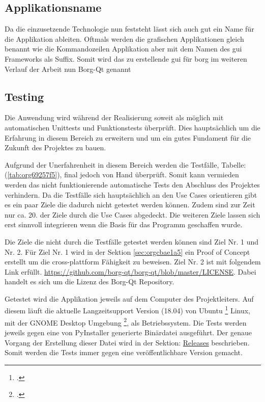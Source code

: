 \subsection{Applikationsname}
\label{sec:org525ca03}

Da die einzusetzende Technologie nun feststeht lässt sich auch gut ein Name für
die Applikation ableiten. Oftmals werden die grafischen Applikationen gleich
benannt wie die Kommandozeilen Applikation aber mit dem Namen des \gls{gui}
Frameworks als Suffix. Somit wird das zu erstellende \gls{gui} für \gls{borg} im
weiteren Verlauf der Arbeit nun Borg-Qt genannt

\subsection{Testing}
\label{sec:org8458d46}

Die Anwendung wird während der Realisierung soweit als möglich mit
automatischen Unittests und Funktionstests überprüft. Dies hauptsächlich um die
Erfahrung in diesem Bereich zu erweitern und um ein gutes Fundament für die
Zukunft des Projektes zu bauen.

Aufgrund der Unerfahrenheit in diesem Bereich werden die Testfälle,
Tabelle:(\ref{tab:org69257f5}), final jedoch von Hand überprüft. Somit kann vermieden
werden das nicht funktionierende automatische Tests den Abschluss des Projektes
verhindern. Da die Testfälle sich hauptsächlich an den Use Cases orientieren
gibt es ein paar Ziele die dadurch nicht getestet werden können. Zudem sind zur
Zeit nur ca. 20. der Ziele durch die Use Cases abgedeckt. Die weiteren Ziele
lassen sich erst sinnvoll integrieren wenn die Basis für das Programm
geschaffen wurde.

Die Ziele die nicht durch die Testfälle getestet werden können sind Ziel Nr. 1
und Nr. 2. Für Ziel Nr. 1 wird in der Sektion \ref{sec:orgcbae1a5} ein Proof of Concept
erstellt um die cross-plattform Fähigkeit zu beweisen. Ziel Nr. 2 ist mit
folgendem Link erfüllt. \url{https://github.com/borg-qt/borg-qt/blob/master/LICENSE}.
Dabei handelt es sich um die Lizenz des Borg-Qt Repository.

Getestet wird die Applikation jeweils auf dem Computer des Projektleiters. Auf
diesem läuft die aktuelle Langzeitsupport Version (18.04) von Ubuntu
\footcite{ubuntu} Linux, mit der GNOME Desktop Umgebung \footcite{gnome}, als
Betriebssystem. Die Tests werden jeweils gegen eine von PyInstaller generierte
Binärdatei ausgeführt. Der genaue Vorgang der Erstellung dieser Datei wird in
der Sektion: \hyperref[sec:org8ba8c5e]{Releases} beschrieben. Somit werden die Tests immer gegen eine
veröffentlichbare Version gemacht.

